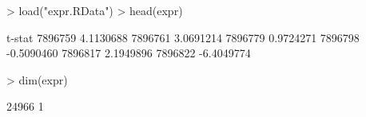 \begin{Schunk}
\begin{Sinput}
> load("expr.RData")
> head(expr)
\end{Sinput}
\begin{Soutput}
            t-stat
7896759  4.1130688
7896761  3.0691214
7896779  0.9724271
7896798 -0.5090460
7896817  2.1949896
7896822 -6.4049774
\end{Soutput}
\begin{Sinput}
> dim(expr)
\end{Sinput}
\begin{Soutput}
[1] 24966     1
\end{Soutput}
\end{Schunk}

